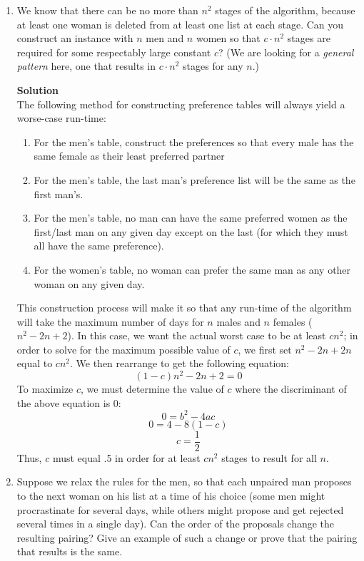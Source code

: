 \documentclass[11pt]{article}
\newenvironment{Parts}{\begin{enumerate}[label=(\alph*)]}{\end{enumerate}}
\newcommand*{\Part}{\item}
\newenvironment{Answer}{\vspace{10pt}\begin{mdframed}\textbf{Solution}\\}{\end{mdframed}\vfill\pagebreak[3]}
\newenvironment{Answer}{\vspace{10pt}}{\vfill\pagebreak[3]}
\begin{document}
\begin{Parts}
\begin{Answer}
\begin{center}
\begin{tabular}{ c | c  }
\end{tabular}
\end{center}
\{(D,1), (A,2), (B,3), (C,4) \}
\end{Answer}

\Part  We know that there can be no more than $n^2$ stages of the algorithm, because at least one woman is deleted from at least one list at each stage.  Can you construct an instance with $n$ men and $n$ women so that $c\cdot n^2$ stages are required for some respectably large constant $c$? (We are looking for a {\em general pattern} here, one that results in $c\cdot n^2$ stages for any $n$.)

\begin{Answer}
The following method for constructing preference tables will always yield a worse-case run-time:
\begin{enumerate}
\item For the men's table, construct the preferences so that every male has the same female as their least preferred partner
\item For the men's table, the last man's preference list will be the same as the first man's.
\item For the men's table, no man can have the same preferred women as the first/last man on any given day except on the last (for which they must all have the same preference).
\item For the women's table, no woman can prefer the same man as any other woman on any given day.
\end{enumerate}
This construction process will make it so that any run-time of the algorithm will take the maximum number of days for $n$ males and $n$ females ($n^2-2n+2$). In this case, we want the actual worst case to be at least $cn^2$; in order to solve for the maximum possible value of $c$, we first set $n^2-2n+2n$ equal to $cn^2$. We then rearrange to get the following equation: $$(1-c)n^2-2n+2=0$$
To maximize $c$, we must determine the value of $c$ where the discriminant of the above equation is 0: $$0=b^2-4ac$$ $$0=4-8(1-c)$$ $$c=\frac{1}{2}$$ Thus, $c$ must equal .5 in order for at least $cn^2$ stages to result for all $n$.
\end{Answer}

\Part Suppose we relax the rules for the men, so that each
unpaired man proposes to the next woman on his list at a 
time of his choice (some men might procrastinate for several
days, while others might propose and get rejected several times
in a single day). Can the order of the proposals change 
the resulting pairing? Give an example of such a change or 
prove that the pairing that results is the same.


\end{Parts}
\end{document}
